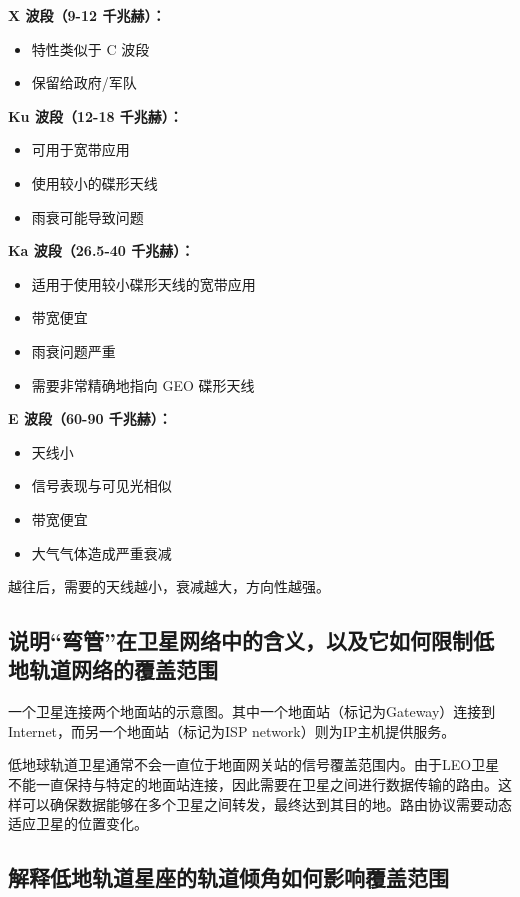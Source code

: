 \textbf{X 波段（9-12 千兆赫）：}
\begin{itemize}
	\item 特性类似于 C 波段
	\item 保留给政府/军队
\end{itemize}

\textbf{Ku 波段（12-18 千兆赫）：}
\begin{itemize}
	\item 可用于宽带应用
	\item 使用较小的碟形天线
	\item 雨衰可能导致问题
\end{itemize}

\textbf{Ka 波段（26.5-40 千兆赫）：}
\begin{itemize}
	\item 适用于使用较小碟形天线的宽带应用
	\item 带宽便宜
	\item 雨衰问题严重
	\item 需要非常精确地指向 GEO 碟形天线
\end{itemize}

\textbf{E 波段（60-90 千兆赫）：}
\begin{itemize}
	\item 天线小
	\item 信号表现与可见光相似
	\item 带宽便宜
	\item 大气气体造成严重衰减
\end{itemize}

越往后，需要的天线越小，衰减越大，方向性越强。

\subsection{说明``弯管''在卫星网络中的含义，以及它如何限制低地轨道网络的覆盖范围}

一个卫星连接两个地面站的示意图。其中一个地面站（标记为Gateway）连接到Internet，而另一个地面站（标记为ISP network）则为IP主机提供服务。

低地球轨道卫星通常不会一直位于地面网关站的信号覆盖范围内。由于LEO卫星不能一直保持与特定的地面站连接，因此需要在卫星之间进行数据传输的路由。这样可以确保数据能够在多个卫星之间转发，最终达到其目的地。路由协议需要动态适应卫星的位置变化。

\subsection{解释低地轨道星座的轨道倾角如何影响覆盖范围}

